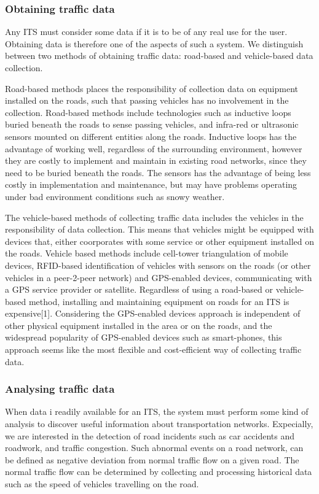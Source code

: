 \subsubsection*{Obtaining traffic data}
Any ITS must consider some data if it is to be of any real use for the user. Obtaining data is therefore one of the aspects of such a system. We distinguish between two methods of obtaining traffic data: road-based and vehicle-based data collection. 

Road-based methods places the responsibility of collection data on equipment installed on the roads, such that passing vehicles has no involvement in the collection. Road-based methods\cite{PIARC0} include technologies such as inductive loops buried beneath the roads to sense passing vehicles, and infra-red or ultrasonic sensors mounted on different entities along the roads. Inductive loops has the advantage of working well, regardless of the surrounding environment, however they are costly to implement and maintain in existing road networks, since they need to be buried beneath the roads. The sensors has the advantage of being less costly in implementation and maintenance, but may have problems operating under bad environment conditions such as snowy weather\cite{KamranHaas2007,PIARC0}.

The vehicle-based methods of collecting traffic data includes the vehicles in the responsibility of data collection. This means that vehicles might be equipped with devices that, either coorporates with some service or other equipment installed on the roads. Vehicle based methods include cell-tower triangulation of mobile devices, RFID-based identification of vehicles with sensors on the roads (or other vehicles in a peer-2-peer network) and GPS-enabled devices, communicating with a GPS service provider or satellite. Regardless of using a road-based or vehicle-based method, installing and maintaining equipment on roads for an ITS is expensive[1]. Considering the GPS-enabled devices approach is independent of other physical equipment installed in the area or on the roads, and the widespread popularity of GPS-enabled devices such as smart-phones, this approach seems like the most flexible and cost-efficient way of collecting traffic data.

\subsubsection*{Analysing traffic data}
When data i readily available for an ITS, the system must perform some kind of analysis to discover useful information about transportation networks. Expecially, we are interested in the detection of road incidents such as car accidents and roadwork, and traffic congestion. Such abnormal events on a road network, can be defined as negative deviation from normal traffic flow on a given road. The normal traffic flow can be determined by collecting and processing historical data such as the speed of vehicles travelling on the road.


